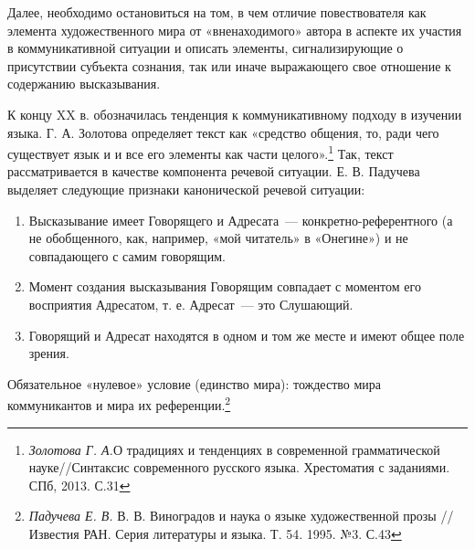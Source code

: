 \documentclass{kursa4}
\begin{document}
{      Далее, необходимо остановиться на том, в чем отличие повествователя
      как элемента художественного мира от «вненаходимого» автора в аспекте
      их участия в коммуникативной ситуации и описать элементы,
      сигнализирующие о присутствии субъекта сознания, так или иначе
      выражающего свое отношение к содержанию высказывания. 

      К концу XX в. обозначилась тенденция к коммуникативному подходу в
      изучении языка. Г. А. Золотова определяет текст как «средство общения,
      то, ради чего существует язык и и все его элементы как части
      целого».\footnote{\textit{Золотова Г. А.}О традициях и тенденциях в современной грамматической науке//Синтаксис современного русского языка. Хрестоматия с заданиями. СПб, 2013. С.31} Так, текст рассматривается в
      качестве компонента речевой ситуации. \newline
      Е. В. Падучева выделяет следующие признаки канонической речевой
      ситуации: 

      \begin{enumerate}
      \item Высказывание имеет Говорящего и Адресата~--- конкретно-референтного
      (а не обобщенного, как, например, «мой читатель» в «Онегине») и не
      совпадающего с самим говорящим. 
      \item Момент создания высказывания Говорящим совпадает с моментом его
      восприятия Адресатом, т. е. Адресат~--- это Слушающий. 
      \item Говорящий и Адресат находятся в одном и том же месте и имеют общее
      поле зрения. 
      \end{enumerate}
      Обязательное «нулевое» условие (единство мира): тождество мира
      коммуникантов и мира их референции.\footnote{\textit{Падучева Е. В. }В. В. Виноградов и наука о языке художественной прозы // Известия РАН. Серия литературы и языка. Т. 54. 1995. №3. С.43} 

}
\end{document}
